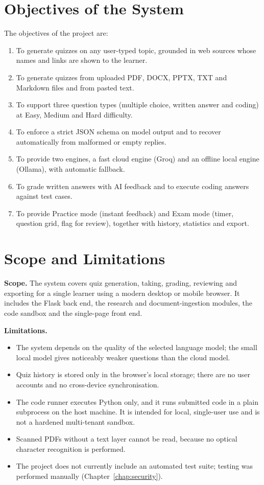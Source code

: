 \section{Objectives of the System}
The objectives of the project are:
\begin{enumerate}
\item To generate quizzes on any user-typed topic, grounded in web sources whose names and links are shown to the learner.
\item To generate quizzes from uploaded PDF, DOCX, PPTX, TXT and Markdown files and from pasted text.
\item To support three question types (multiple choice, written answer and coding) at Easy, Medium and Hard difficulty.
\item To enforce a strict JSON schema on model output and to recover automatically from malformed or empty replies.
\item To provide two engines, a fast cloud engine (Groq) and an offline local engine (Ollama), with automatic fallback.
\item To grade written answers with AI feedback and to execute coding answers against test cases.
\item To provide Practice mode (instant feedback) and Exam mode (timer, question grid, flag for review), together with history, statistics and export.
\end{enumerate}

\section{Scope and Limitations}
\textbf{Scope.} The system covers quiz generation, taking, grading, reviewing and exporting for a single learner using a modern desktop or mobile browser. It includes the Flask back end, the research and document-ingestion modules, the code sandbox and the single-page front end.

\textbf{Limitations.}
\begin{itemize}
\item The system depends on the quality of the selected language model; the small local model gives noticeably weaker questions than the cloud model.
\item Quiz history is stored only in the browser's local storage; there are no user accounts and no cross-device synchronisation.
\item The code runner executes Python only, and it runs submitted code in a plain subprocess on the host machine. It is intended for local, single-user use and is not a hardened multi-tenant sandbox.
\item Scanned PDFs without a text layer cannot be read, because no optical character recognition is performed.
\item The project does not currently include an automated test suite; testing was performed manually (Chapter~\ref{chap:security}).
\end{itemize}

